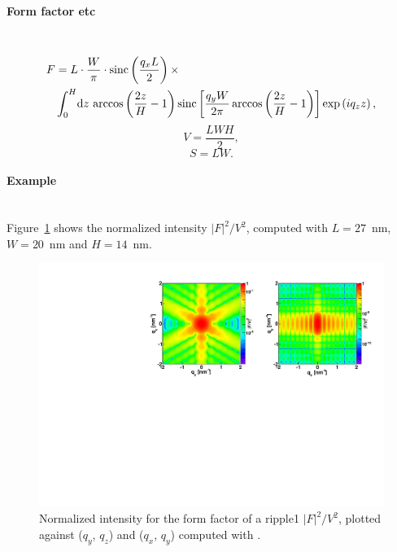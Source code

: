 \paragraph{Form factor etc}\strut\\
\begin{align*}
F &=L \cdot \frac{W}{\pi}\cdot \operatorname{sinc}\left(\frac{q_xL}{2}\right)\times \\
&\int_0^H\!\text{d} z\, \arccos\left(\frac{2z}{H}-1\right)\operatorname{sinc}\left[\frac{q_yW}{2\pi}\arccos\left(\frac{2z}{H} - 1\right)\right]\exp\left(iq_zz\right),
\end{align*}
\begin{equation*}
  V = \dfrac{L W H}{2},
\end{equation*}
\begin{equation*}
  S = L W.
\end{equation*}

\paragraph{Example}\strut\\
Figure~\ref{fig:FFripple1Ex} shows the normalized intensity
$|F|^2/V^2$, computed with $L=27$~nm, $W=20$~nm and $H=14$~nm.

\begin{figure}[h]
\begin{center}
\includegraphics[angle=-90,width=\textwidth]{fig/ff/figffripple1.pdf}
\end{center}
\caption{Normalized intensity for the form factor of a ripple1
  $|F|^2/V^2$, plotted against ($q_y$, $q_z$) and  ($q_x$, $q_y$)
  computed with .}
\label{fig:FFripple1Ex}
\end{figure}


